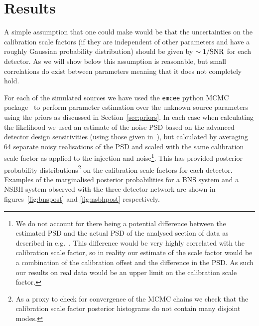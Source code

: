 \documentclass[prd, twocolumn, lengthcheck, superscriptaddress, showpacs, letterpaper, nofootinbib]{revtex4-1}
\begin{document}
\section{Results}\label{sec:results}

A simple assumption that one could make would be that the uncertainties on the
calibration scale factors (if they are independent of other parameters and have
a roughly Gaussian probability distribution) should be given by $\sim 1/{\rm
SNR}$ for each detector. As we will show below this assumption is reasonable,
but small correlations do exist between parameters meaning that it does not
completely hold.

For each of the simulated sources we have used the {\tt emcee} python \ac{MCMC}
package~\cite{2013PASP..125..306F} to perform parameter estimation over the
unknown source parameters using the priors as discussed in
Section~\ref{sec:priors}. In each case when calculating the likelihood we used
an estimate of the noise \ac{PSD} based on the advanced detector design
sensitivities (using those given in~\cite{2013arXiv1304.0670L}), but calculated by averaging 
64 separate noisy realisations of the \ac{PSD} and scaled
with the same calibration scale factor as applied to the injection and noise\footnote{We do not account for there 
being a potential difference
between the estimated \ac{PSD} and the actual \ac{PSD} of the analysed section
of data as described in e.g.\ \cite{2013PhRvD..88h4044L}. This difference would
be very highly correlated with the calibration scale factor, so in reality our
estimate of the scale factor would be a combination of the calibration offset
and the difference in the \ac{PSD}. As such our results on real data would be
an upper limit on the calibration scale factor.}. This has provided posterior probability
distributions\footnote{As a proxy to check for convergence of the MCMC chains
we check that the calibration scale factor posterior histograms do not contain many disjoint modes.}
on the calibration scale factors for each detector.  Examples of
the marginalised posterior probabilities for a \ac{BNS} system and a \ac{NSBH}
system observed with the three detector network are shown in
figures~\ref{fig:bnspost} and \ref{fig:nsbhpost} respectively.
\end{document}
